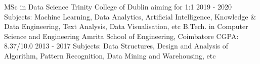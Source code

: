 \begin{cventries}
  \cventry
    {MSc in Data Science}
    {Trinity College of Dublin}
    {aiming for 1:1}
    {2019 - 2020}
    {Subjects: Machine Learning, Data Analytics, Artificial Intelligence, Knowledge \& Data Engineering, Text Analysis, Data Visualisation, etc}
  \cventry
    {B.Tech. in Computer Science and Engineering}
    {Amrita School of Engineering, Coimbatore}
    {CGPA: 8.37/10.0}
    {2013 - 2017}
    {Subjects: Data Structures, Design and Analysis of Algorithm, Pattern Recognition, Data Mining and Warehousing, etc}
\end{cventries}
